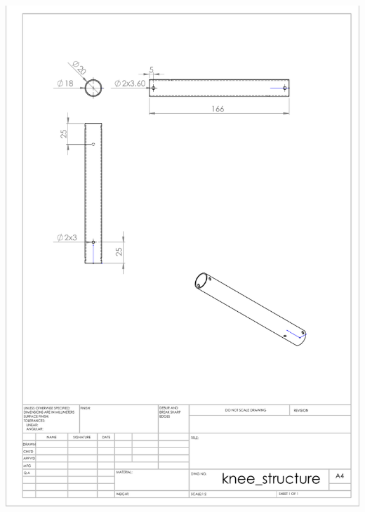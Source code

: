 \documentclass[12pt]{report}
\begin{document}
\begin{appendices}
            \includegraphics[width=\linewidth]{chapters/cha_appendices/knee_structure.PDF}
    \end{appendices}
\end{document}
